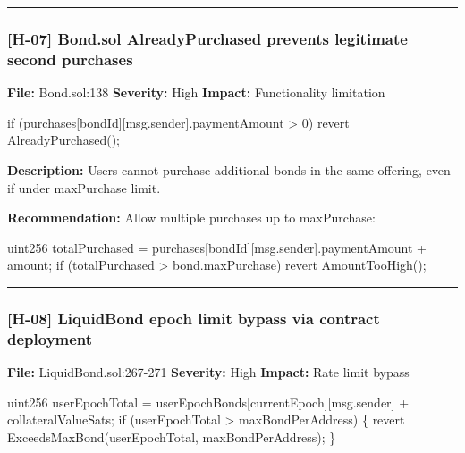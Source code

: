 \documentclass[
]{article}
\newenvironment{Shaded}{}{}
\newcommand{\NormalTok}[1]{#1}
\begin{document}
\begin{center}\rule{0.5\linewidth}{0.5pt}\end{center}

\subsubsection{{[}H-07{]} Bond.sol AlreadyPurchased prevents legitimate
second
purchases}\label{h-07-bondsol-alreadypurchased-prevents-legitimate-second-purchases}

\textbf{File:} Bond.sol:138 \textbf{Severity:} High \textbf{Impact:}
Functionality limitation

\begin{Shaded}
\begin{Highlighting}[]
\NormalTok{if (purchases[bondId][msg.sender].paymentAmount \textgreater{} 0) revert AlreadyPurchased();}
\end{Highlighting}
\end{Shaded}

\textbf{Description:} Users cannot purchase additional bonds in the same
offering, even if under maxPurchase limit.

\textbf{Recommendation:} Allow multiple purchases up to maxPurchase:

\begin{Shaded}
\begin{Highlighting}[]
\NormalTok{uint256 totalPurchased = purchases[bondId][msg.sender].paymentAmount + amount;}
\NormalTok{if (totalPurchased \textgreater{} bond.maxPurchase) revert AmountTooHigh();}
\end{Highlighting}
\end{Shaded}

\begin{center}\rule{0.5\linewidth}{0.5pt}\end{center}

\subsubsection{{[}H-08{]} LiquidBond epoch limit bypass via contract
deployment}\label{h-08-liquidbond-epoch-limit-bypass-via-contract-deployment}

\textbf{File:} LiquidBond.sol:267-271 \textbf{Severity:} High
\textbf{Impact:} Rate limit bypass

\begin{Shaded}
\begin{Highlighting}[]
\NormalTok{uint256 userEpochTotal = userEpochBonds[currentEpoch][msg.sender] + collateralValueSats;}
\NormalTok{if (userEpochTotal \textgreater{} maxBondPerAddress) \{}
\NormalTok{    revert ExceedsMaxBond(userEpochTotal, maxBondPerAddress);}
\NormalTok{\}}
\end{Highlighting}
\end{Shaded}
\end{document}
